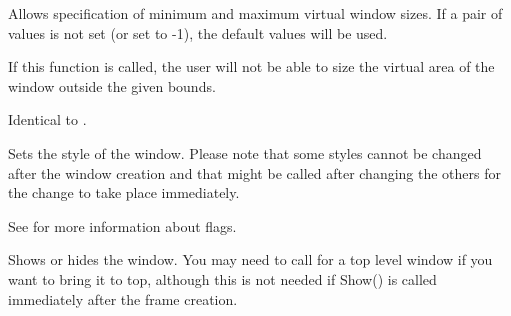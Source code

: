 Allows specification of minimum and maximum virtual window sizes.
If a pair of values is not set (or set to -1), the default values
will be used.







If this function is called, the user will not be able to size the virtual area
of the window outside the given bounds.

\label{wxwindowsetwindowstyle}


Identical to .

\label{wxwindowsetwindowstyleflag}


Sets the style of the window. Please note that some styles cannot be changed
after the window creation and that  might
be called after changing the others for the change to take place immediately.

See  for more information about flags.



\label{wxwindowshow}


Shows or hides the window. You may need to call 
for a top level window if you want to bring it to top, although this is not
needed if Show() is called immediately after the frame creation.




